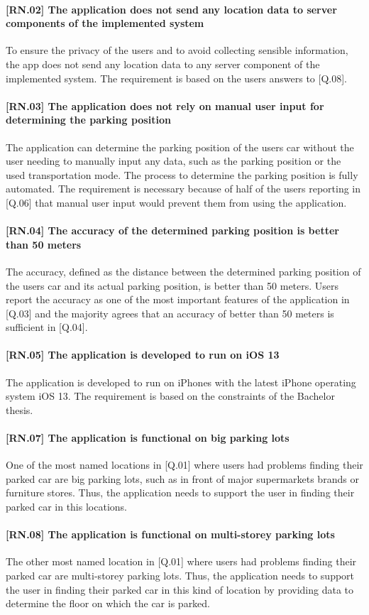\paragraph{[RN.02] The application does not send any location data to server components of the implemented system}
To ensure the privacy of the users and to avoid collecting sensible information, the app does not send any location data to any server component of the implemented system. The requirement is based on the users answers to [Q.08].

\paragraph{[RN.03] The application does not rely on manual user input for determining the parking position}
The application can determine the parking position of the users car without the user needing to manually input any data, such as the parking position or the used transportation mode. The process to determine the parking position is fully automated. The requirement is necessary because of half of the users reporting in [Q.06] that manual user input would prevent them from using the application.

\paragraph{[RN.04] The accuracy of the determined parking position is better than 50 meters}
The accuracy, defined as the distance between the determined parking position of the users car and its actual parking position, is better than 50 meters. Users report the accuracy as one of the most important features of the application in [Q.03] and the majority agrees that an accuracy of better than 50 meters is sufficient in [Q.04]. 

\paragraph{[RN.05] The application is developed to run on iOS 13}
The application is developed to run on iPhones with the latest iPhone operating system iOS 13. The requirement is based on the constraints of the Bachelor thesis. 

\paragraph{[RN.07] The application is functional on big parking lots}
One of the most named locations in [Q.01] where users had problems finding their parked car are big parking lots, such as in front of major supermarkets brands or furniture stores. Thus, the application needs to support the user in finding their parked car in this locations.

\paragraph{[RN.08] The application is functional on multi-storey parking lots}
The other most named location in [Q.01] where users had problems finding their parked car are multi-storey parking lots. Thus, the application needs to support the user in finding their parked car in this kind of location by providing data to determine the floor on which the car is parked. 